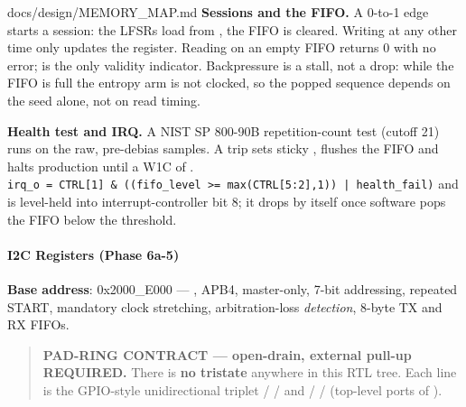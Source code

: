 \begin{relocated}{docs/design/MEMORY_MAP.md}
\textbf{Sessions and the FIFO.} A  0-to-1 edge starts a
session: the LFSRs load from , the FIFO is cleared.
Writing  at any other time only updates the register.
Reading  on an empty FIFO returns 0 with no error;
 is the only validity indicator. Backpressure is
a stall, not a drop: while the FIFO is full the entropy arm is not
clocked, so the popped sequence depends on the seed alone, not on read
timing.

\textbf{Health test and IRQ.} A NIST SP 800-90B repetition-count test
(cutoff 21) runs on the raw, pre-debias samples. A trip sets sticky
, flushes the FIFO and halts production until a W1C of
.
\texttt{irq\_\allowbreak{}o\ =\allowbreak{}\ CTRL[1]\ \&\ ((fifo\_\allowbreak{}level\ >=\allowbreak{}\ max(CTRL[5:\allowbreak{}2],\allowbreak{}1))\ |\ health\_\allowbreak{}fail)}
and is level-held into interrupt-controller bit 8; it drops by itself
once software pops the FIFO below the threshold.

\paragraph{I2C Registers (Phase 6a-5)}\label{ds:mm:memory-map:i2c-registers-phase-6a-5}

\textbf{Base address}: 0x2000\_\allowbreak{}E000 ---
, APB4, master-only, 7-bit addressing,
repeated START, mandatory clock stretching, arbitration-loss
\emph{detection}, 8-byte TX and RX FIFOs.

\begin{quote}
\textbf{PAD-RING CONTRACT --- open-drain, external pull-up REQUIRED.}
There is \textbf{no tristate} anywhere in this RTL tree. Each line is
the GPIO-style unidirectional triplet  /
 /  and  /
 /  (top-level ports of
).


\end{quote}
\end{relocated}
